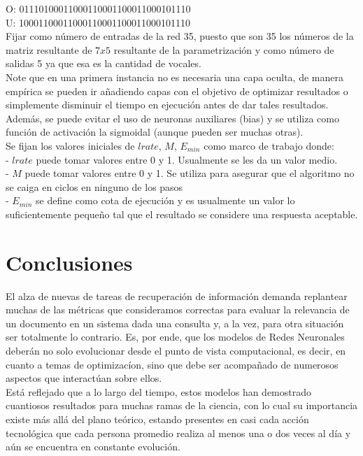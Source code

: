 \documentclass{llncs}
\begin{document}
{O: 01110100011000110001100011000101110 \\

U: 10001100011000110001100011000101110 \\

Fijar como n\'umero de entradas de la red 35, puesto que son 35 los n\'umeros de la matriz resultante de $7x5$ resultante de la parametrizaci\'on
y como n\'umero de salidas 5 ya que esa es la cantidad de vocales.\\

Note que en una primera instancia no es necesaria una capa oculta, de manera emp\'irica se pueden ir a\~nadiendo capas con el objetivo de optimizar
resultados o simplemente disminuir el tiempo en ejecuci\'on antes de dar tales resultados. Adem\'as, se puede evitar el uso de neuronas auxiliares (bias)
y se utiliza como funci\'on de activaci\'on la sigmoidal (aunque pueden ser muchas otras). \\
Se fijan los valores iniciales de $lrate$, $M$, $E_{min}$ como marco de trabajo donde:\\
- $lrate$ puede tomar valores entre 0 y 1. Usualmente se les da un valor medio. \\
- $M$ puede tomar valores entre 0 y 1. Se utiliza para asegurar que el algoritmo no se caiga en ciclos en ninguno de los pasos\\
- $E_{min}$ se define como cota de ejecuci\'on y es usualmente un valor lo suficientemente peque\~no tal que el resultado se considere una respuesta aceptable.

\section{Conclusiones}

El alza de nuevas de tareas de recuperaci\'on de informaci\'on demanda replantear muchas de las m\'etricas que consideramos correctas para evaluar la relevancia
de un documento en un sistema dada una consulta y, a la vez, para otra situaci\'on ser totalmente lo contrario. Es, por ende, que los modelos de Redes Neuronales
deber\'an no solo evolucionar desde el punto de vista computacional, es decir, en cuanto a temas de optimizac\'ion, sino que debe ser acompa\~nado de numerosos
aspectos que interac\-t\'uan sobre ellos. \\
Est\'a reflejado que a lo largo del tiempo, estos modelos han demostrado cuantiosos resultados para muchas ramas de la ciencia, con lo cual su importancia existe
m\'as all\'a del plano te\'orico, estando presentes en casi cada acci\'on tecnol\'ogica que cada persona promedio realiza al menos una o dos veces al d\'ia y a\'un se
encuentra en constante evoluci\'on.


}
\end{document}
